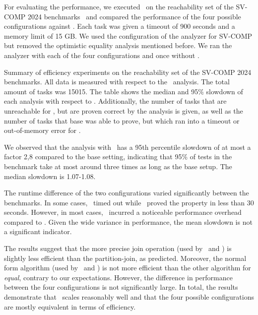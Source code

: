 For evaluating the performance, we executed \cpo\ on the reachability set
of the SV-COMP 2024 benchmarks~\cite{Beyer24} and compared the performance of the four possible configurations against \base.
Each task was given a timeout of 900 seconds and a memory limit of 15 GB.\@
We used the configuration of the analyzer for SV-COMP but removed the optimistic equality analysis mentioned before.
We ran the analyzer with each of the four configurations and once without \cpo.

\begin{table}[t]
    \centering
    \caption[Results of experiments on SV-COMP.]{Summary of efficiency experiments on the reachability set
        of the SV-COMP 2024 benchmarks.
        All data is measured with respect to the \base\ analysis.
        The total amount of tasks was 15015.
        The table shows the median and 95\% slowdown of each analysis with respect to \base.
        Additionally, the number of tasks that are unreachable for \base, but are proven correct by the analysis is given, as well as the number of tasks that base was able to prove, but which ran into a timeout or out-of-memory error for \cpo.
        }\label{tab:summary-svcomp}
    
\end{table}

We observed that the analysis with \cpo\ has a 95th percentile slowdown of at most a factor 2,8 compared to the base setting,
indicating that 95\% of tests in the benchmark take at most around three times as long as the base setup.
The median slowdown is 1.07-1.08.

The runtime difference of the two configurations varied significantly between the benchmarks.
In some cases, \base\ timed out while \cpo\ proved the property in less than 30 seconds.
However, in most cases, \cpo\ incurred a noticeable performance overhead compared to \base.
Given the wide variance in performance, the mean slowdown is not a significant indicator.

The results suggest that the more precise join operation (used by \cpou\ and \cpot) is slightly less efficient than the partition-join, as predicted.
Moreover, the normal form algorithm (used by \cpou\ and \cpod) is not more efficient than the other algorithm for \emph{equal}, contrary to our expectations.
However, the difference in performance between the four configurations is not significantly large.
In total, the results demonstrate that \cpo\ scales reasonably well and that the four possible configurations are mostly equivalent in terms of efficiency.

